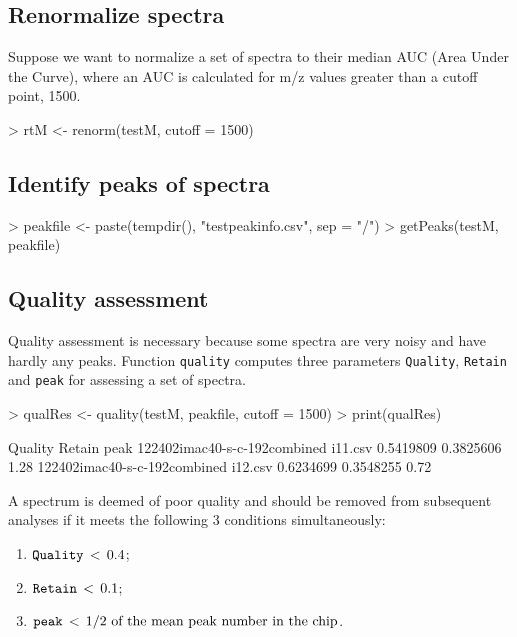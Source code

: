 \documentclass[12pt]{article}
\begin{document}
\subsection{Renormalize spectra}
Suppose we want to normalize a set of spectra to their median 
AUC (Area Under the Curve), where an AUC is calculated for
m/z values greater than a cutoff point, 1500.

\begin{Schunk}
\begin{Sinput}
> rtM <- renorm(testM, cutoff = 1500)
\end{Sinput}
\end{Schunk}

\subsection{Identify peaks of spectra}
\begin{Schunk}
\begin{Sinput}
> peakfile <- paste(tempdir(), "testpeakinfo.csv", sep = "/")
> getPeaks(testM, peakfile)
\end{Sinput}
\end{Schunk}

\subsection{Quality assessment}
Quality assessment is necessary because some spectra are very 
noisy and have hardly any peaks. Function {\tt quality} 
computes three parameters {\tt Quality}, {\tt Retain} and 
{\tt peak} for assessing a set of spectra.
\begin{Schunk}
\begin{Sinput}
> qualRes <- quality(testM, peakfile, cutoff = 1500)
> print(qualRes)
\end{Sinput}
\begin{Soutput}
                                       Quality    Retain peak
122402imac40-s-c-192combined i11.csv 0.5419809 0.3825606 1.28
122402imac40-s-c-192combined i12.csv 0.6234699 0.3548255 0.72
\end{Soutput}
\end{Schunk}

A spectrum is deemed of poor quality and should be removed from
subsequent analyses if it meets the following 3
conditions simultaneously:
\begin{enumerate}
\item $\mbox{\tt Quality}\, <\, 0.4$;
\item $\mbox{\tt Retain}\, <\, 0.1 $;
\item $\mbox{\tt peak} \,< \,1/2 \mbox{ of the mean peak number in the
chip}$.
\end{enumerate}
\end{document}
